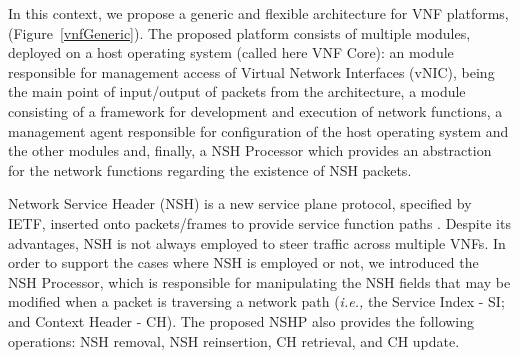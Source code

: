 In this context, we propose a generic and flexible architecture for VNF platforms, (Figure~\ref{vnfGeneric}). The proposed platform consists of multiple modules, deployed on a host operating system (called here VNF Core): an module responsible for management access of Virtual Network Interfaces (vNIC), being the main point of input/output of packets from the architecture, a module consisting of a framework for development and execution of network functions, a management agent responsible for configuration of the host operating system and the other modules and, finally, a NSH Processor which provides an abstraction for the network functions regarding the existence of NSH packets.


Network Service Header (NSH) is a new service plane protocol, specified by IETF, inserted onto packets/frames to provide service function paths \cite{Quinn-2018}. Despite its advantages, NSH is not always employed to steer traffic across multiple VNFs. In order to support the cases where NSH is employed or not, we introduced the NSH Processor, which is responsible for manipulating the NSH fields that may be modified when a packet is traversing a network path (\textit{i.e.,} the Service Index - SI; and Context Header - CH). The proposed NSHP also provides the following operations: NSH removal, NSH reinsertion, CH retrieval, and CH update.

